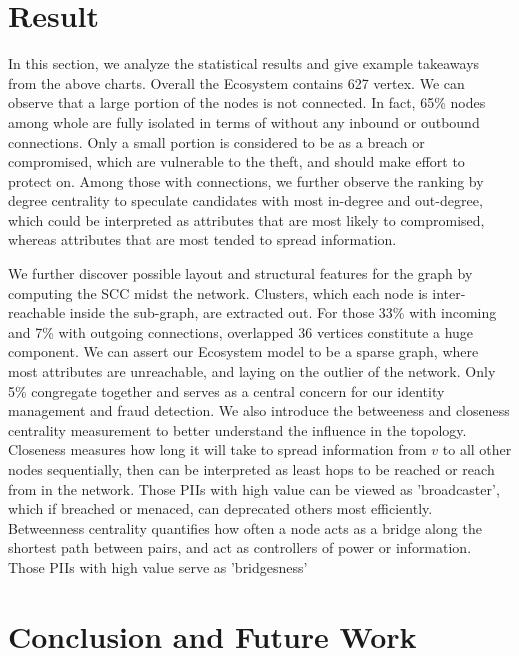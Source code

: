\documentclass[letterpaper, 10 pt, conference]{ieeeconf}  %
\begin{document}
\section{Result}
In this section, we analyze the statistical results and give example takeaways from the above charts. Overall the Ecosystem contains 627 vertex. We  can  observe  that  a  large portion  of  the  nodes  is not  connected.  In  fact,  65\%  nodes among  whole  are  fully  isolated  in  terms  of  without  any inbound  or  outbound  connections.  Only  a  small  portion  is considered  to  be  as  a  breach  or  compromised,  which  are vulnerable  to  the  theft,  and should  make  effort  to  protect on. Among those with connections, we further observe the ranking by degree centrality to speculate candidates with most in-degree and out-degree, which could be interpreted as attributes that are most likely to compromised, whereas attributes that are most tended to spread information. 

We further discover possible layout and structural features for the graph by computing the SCC midst the network. Clusters, which each node is inter-reachable inside the sub-graph, are extracted out. For those 33\% with incoming and 7\% with outgoing connections, overlapped 36 vertices constitute a huge component. 
We can assert our Ecosystem model to be a sparse graph, where most attributes are unreachable, and laying on the outlier of the network. Only 5\% congregate together and serves as a central concern for our identity management and fraud detection.
We also introduce the betweeness and closeness centrality measurement to better understand the influence in the topology. Closeness measures how long it will take to spread information from $v$ to all other nodes sequentially, then can be interpreted as least hops to be reached or reach from in the network. Those PIIs with high value can be viewed as 'broadcaster', which if breached or menaced, can deprecated others most efficiently. Betweenness centrality quantifies how often a node
acts as a bridge along the shortest path between pairs, and act as controllers of power or information. Those PIIs with high value serve as 'bridgesness' 


\section{Conclusion and Future Work}
\end{document}
